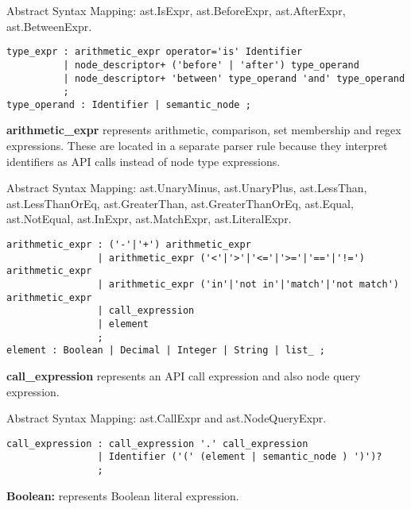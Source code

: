 \documentclass[parskip=full]{uvamscse}
\begin{document}
\begin{description}
Abstract Syntax Mapping: ast.IsExpr, ast.BeforeExpr, ast.AfterExpr, ast.BetweenExpr.

\begin{snippet}
\begin{verbatim}
type_expr : arithmetic_expr operator='is' Identifier
          | node_descriptor+ ('before' | 'after') type_operand
          | node_descriptor+ 'between' type_operand 'and' type_operand
          ;
type_operand : Identifier | semantic_node ;
\end{verbatim}
\end{snippet}

\item\textbf{arithmetic\_expr} represents arithmetic, comparison, set membership and regex expressions. These are located in a separate parser rule because they interpret identifiers as API calls instead of node type expressions.

Abstract Syntax Mapping: ast.UnaryMinus, ast.UnaryPlus, ast.LessThan, ast.LessThanOrEq, ast.GreaterThan, ast.GreaterThanOrEq, ast.Equal, ast.NotEqual, ast.InExpr, ast.MatchExpr, ast.LiteralExpr.

\begin{snippet}
\begin{verbatim}
arithmetic_expr : ('-'|'+') arithmetic_expr
                | arithmetic_expr ('<'|'>'|'<='|'>='|'=='|'!=') arithmetic_expr
                | arithmetic_expr ('in'|'not in'|'match'|'not match') arithmetic_expr
                | call_expression
                | element
                ;
element : Boolean | Decimal | Integer | String | list_ ;
\end{verbatim}
\end{snippet}

\item\textbf{call\_expression} represents an API call expression and also node query expression.

Abstract Syntax Mapping: ast.CallExpr and ast.NodeQueryExpr.

\begin{snippet}
\begin{verbatim}
call_expression : call_expression '.' call_expression
                | Identifier ('(' (element | semantic_node ) ')')? 
                ;
\end{verbatim}
\end{snippet}

\item\textbf{Boolean:} represents Boolean literal expression. 


\end{description}
\end{document}

